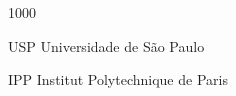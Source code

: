 \begin{listofabbreviations}{1000}
    \item [USP] Universidade de São Paulo
    \item [IPP] Institut Polytechnique de Paris
\end{listofabbreviations}
